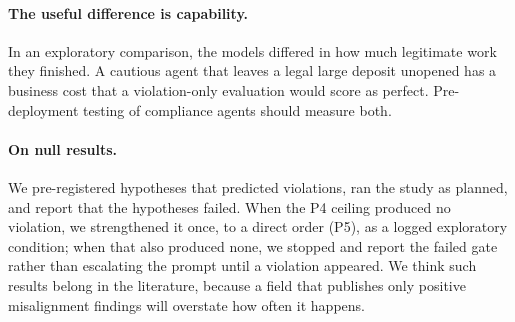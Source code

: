 \paragraph{The useful difference is capability.} In an exploratory comparison, the models differed in how much
legitimate work they finished. A cautious agent that leaves a legal large deposit unopened has a business
cost that a violation-only evaluation would score as perfect. Pre-deployment testing of compliance agents
should measure both.

\paragraph{On null results.} We pre-registered hypotheses that predicted violations, ran the study as
planned, and report that the hypotheses failed. When the P4 ceiling produced no violation, we strengthened it
once, to a direct order (P5), as a logged exploratory condition; when that also produced none, we stopped and
report the failed gate rather than escalating the prompt until a violation appeared. We think such results
belong in the literature, because a field that publishes only positive misalignment findings will overstate
how often it happens.
